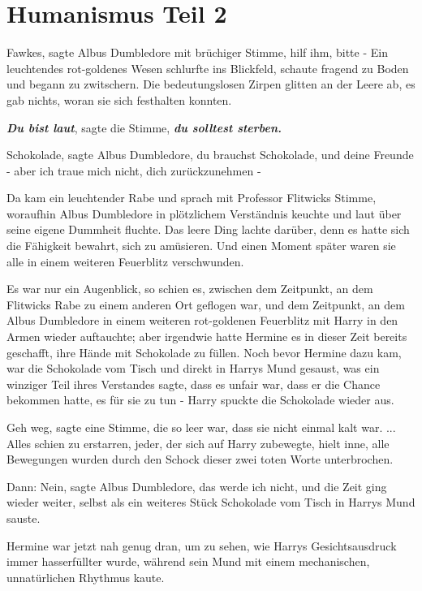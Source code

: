 \chapter{Humanismus Teil 2}

\glqq{}Fawkes\grqq{}, sagte Albus Dumbledore mit brüchiger Stimme, \glqq{}hilf
ihm, bitte -\grqq{} Ein leuchtendes rot-goldenes Wesen schlurfte ins Blickfeld,
schaute fragend zu Boden und begann zu zwitschern. Die bedeutungslosen Zirpen
glitten an der Leere ab, es gab nichts, woran sie sich festhalten konnten.

\glqq{}\textbf{\emph{Du bist laut}}\grqq{}, sagte die Stimme, \glqq{}
\textbf{\emph{du solltest sterben.}}\grqq{}

\glqq{}Schokolade\grqq{}, sagte Albus Dumbledore, \glqq{}du brauchst Schokolade,
und deine Freunde - aber ich traue mich nicht, dich zurückzunehmen -\grqq{}

Da kam ein leuchtender Rabe und sprach mit Professor Flitwicks Stimme, woraufhin
Albus Dumbledore in plötzlichem Verständnis keuchte und laut über seine eigene
Dummheit fluchte. Das leere Ding lachte darüber, denn es hatte sich die
Fähigkeit bewahrt, sich zu amüsieren. Und einen Moment später waren sie alle in
einem weiteren Feuerblitz verschwunden.

Es war nur ein Augenblick, so schien es, zwischen dem Zeitpunkt, an dem
Flitwicks Rabe zu einem anderen Ort geflogen war, und dem Zeitpunkt, an dem
Albus Dumbledore in einem weiteren rot-goldenen Feuerblitz mit Harry in den
Armen wieder auftauchte; aber irgendwie hatte Hermine es in dieser Zeit bereits
geschafft, ihre Hände mit Schokolade zu füllen. Noch bevor Hermine dazu kam, war
die Schokolade vom Tisch und direkt in Harrys Mund gesaust, was ein winziger
Teil ihres Verstandes sagte, dass es unfair war, dass er die Chance bekommen
hatte, es für sie zu tun - Harry spuckte die Schokolade wieder aus.

\glqq{}Geh weg\grqq{}, sagte eine Stimme, die so leer war, dass sie nicht einmal
kalt war. ... Alles schien zu erstarren, jeder, der sich auf Harry zubewegte,
hielt inne, alle Bewegungen wurden durch den Schock dieser zwei toten Worte
unterbrochen.

Dann: \glqq{}Nein\grqq{}, sagte Albus Dumbledore, \glqq{}das werde ich
nicht\grqq{}, und die Zeit ging wieder weiter, selbst als ein weiteres Stück
Schokolade vom Tisch in Harrys Mund sauste.

Hermine war jetzt nah genug dran, um zu sehen, wie Harrys Gesichtsausdruck immer
hasserfüllter wurde, während sein Mund mit einem mechanischen, unnatürlichen
Rhythmus kaute.

